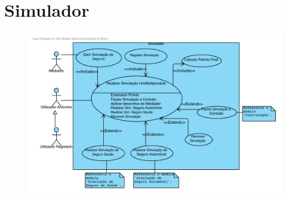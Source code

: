 

\section{Simulador}
\begin{figure}[!htb]
	\centering
	\includegraphics[scale=0.8]{images/Prints/Simulador/Simulador.pdf}
\end{figure}

\pagebreak

